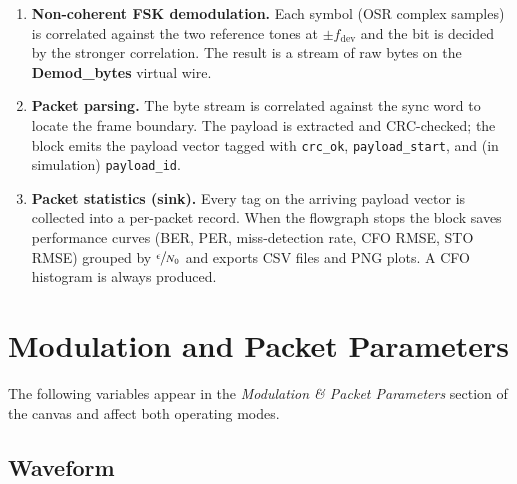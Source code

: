 \begin{enumerate}
  \item \textbf{Non-coherent FSK demodulation.}
    Each symbol (OSR complex samples) is correlated against the two reference  tones at $\pm f_{\mathrm{dev}}$ and the bit is decided by the stronger
    correlation. The result is a stream of raw bytes on the \textbf{Demod\_bytes}
    virtual wire.

  \item \textbf{Packet parsing.}
    The byte stream is correlated against the sync word to locate the frame
    boundary. The payload is extracted and CRC-checked; the block emits the
    payload vector tagged with \texttt{crc\_ok}, \texttt{payload\_start}, and     (in simulation) \texttt{payload\_id}.

  \item \textbf{Packet statistics (sink).}
    Every tag on the arriving payload vector is collected into a per-packet
    record. When the flowgraph stops the block saves performance curves (BER, PER, miss-detection rate, CFO RMSE, STO RMSE) grouped by $\sfrac{\epsilon}{N_0}$ and exports  CSV files and PNG plots. A CFO histogram is always produced.
\end{enumerate}



\section{Modulation and Packet Parameters}
\label{sec:params}

The following variables appear in the \emph{Modulation \& Packet Parameters}
section of the canvas and affect both operating modes.

\subsection*{Waveform}

